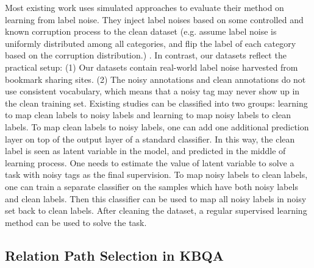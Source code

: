 Most existing work uses simulated approaches to evaluate their method on learning from label noise. They inject label noises based on some controlled and known corruption process to the clean dataset (e.g. assume label noise is uniformly distributed among all categories, and flip the label of each category based on the corruption distribution.) \cite{zhang2018generalized,tanaka2018joint,yi2019probabilistic}. In contrast, our datasets reflect the practical setup: (1) Our datasets contain real-world label noise harvested from bookmark sharing sites. (2) The noisy annotations and clean annotations do not use consistent vocabulary, which means that a noisy tag may never show up in the clean training set. Existing studies can be classified into two groups: learning to map clean labels to noisy labels \cite{sukhbaatar2014learning2,sukhbaatar2014training2,goldberger2016training2} and learning to map noisy labels to clean labels\cite{dehghani2017fidelity2,wu2018light,yuan2018iterative}. To map clean labels to noisy labels, one can add one additional prediction layer on top of the output layer of a standard classifier. In this way, the clean label is seen as latent variable in the model, and predicted in the middle of learning process. One needs to estimate the value of latent variable to solve a task with noisy tags as the final supervision. To map noisy labels to clean labels, one can train a separate classifier on the samples which have both noisy labels and clean labels. Then this classifier can be used to map all noisy labels in noisy set back to clean labels. After cleaning the dataset, a regular supervised learning method can be used to solve the task.



\subsection{Relation Path Selection in KBQA}  \label{future_path}

